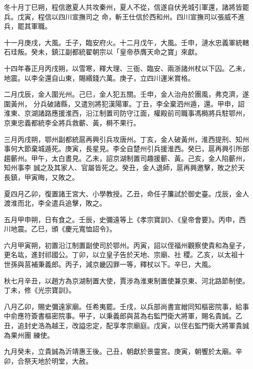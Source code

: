 \begin{pinyinscope}
 冬十月丁巳朔，程信邀夏人共攻秦州，夏人不從，信遂自伏羌城引軍還，諸將皆罷兵。戊寅，程信以四川宣撫司之
 命，斬王仕信於西和州。四川宣撫司以張威不進兵，罷其軍職。



 十一月庚戌，大風。壬子，臨安府火。十二月戊午，大風。壬申，漣水忠義軍統轄石珪叛。癸未，鎮江副都統翟朝宗以「皇帝恭膺天命之寶」來獻。



 十四年春正月丙戌朔，以雪寒，釋大理、三衙、臨安、兩浙諸州杖以下囚。乙未，地震。以李全還自山東，賜緡錢六萬。庚子，立四川運米賞格。



 二月戊辰，金人圍光州。己巳，金人犯五關。壬申，金人治舟於團風，弗克濟，遂圍黃州，
 分兵破諸縣，又遣別將犯漢陽軍。丁丑，李全棄泗州遁，還。甲申，詔淮東、京湖諸路應援淮西，沿江制置司防守江面，權殿前司職事馮榯將兵駐鄂州，京東忠義都統李全將兵救蘄、黃，榯不果行。



 三月丙戌朔，鄂州副都統扈再興引兵攻唐州。丁亥，金人破黃州，淮西提刑、知州事何大節棄城遁死。庚寅，長星見。李全自楚州引兵援淮西。癸巳，扈再興引所部趨蘄州。甲午，太白晝見。乙未，詔京湖制置司趣援蘄、黃。己亥，金人陷蘄州，知州事李
 誠之及其家人、官屬皆死之。癸丑，金人退師，扈再興邀擊，敗之於天長鎮，甲寅晦，又敗之。



 夏四月乙卯，復置諸王宮大、小學教授。乙丑，命任子簾試於御史臺。戊辰，金人渡淮而北，李全遣兵追擊，敗之。



 五月甲申朔，日有食之。壬辰，史彌遠等上《孝宗寶訓》、《皇帝會要》。丙申，西川地震。乙巳，頒《慶元寬恤詔令》。



 六月甲寅朔，初置沿江制置副使司於鄂州。丙寅，詔以侄福州觀察使貴和為皇子，更名竑，進封祁國公。丁卯，以立皇子告於天地、宗廟、社
 稷。乙亥，以太祖十世孫與莒補秉義郎。丙子，減京畿囚罪一等，釋杖以下。辛巳，大風。



 秋七月辛丑，以趙方為京湖制置大使，賈涉為淮東制置使兼京東、河北路節制使。丁未，修《光宗寶訓》。



 八月乙卯，賜史彌遠家廟。任希夷罷。壬戌，以兵部尚書宣繒同知樞密院事，給事中俞應符簽書樞密院事。甲子，以秉義郎與莒為右監門衛大將軍，賜名貴誠。乙丑，追封史浩為越王，改謚忠定，配享孝宗廟庭。戊寅，以侄右監門衛大將軍貴誠為果州團
 練使。



 九月癸未，立貴誠為沂靖惠王後。己丑，朝獻於景靈宮。庚寅，朝饗於太廟。辛卯，合祭天地於明堂，大赦。




\end{pinyinscope}
